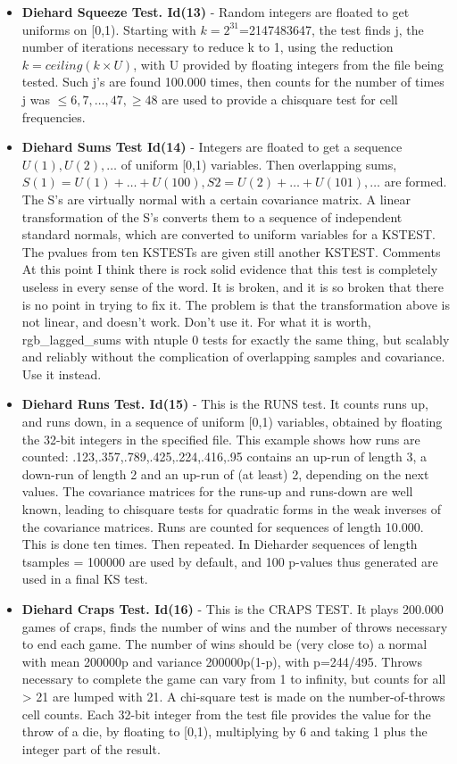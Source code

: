 \begin{itemize}
   \item \textbf{Diehard Squeeze Test. Id(13)} - 
Random integers are floated to get uniforms on [0,1). Starting with $k=2^{31}$=2147483647, the test finds j, the number of iterations necessary to reduce k to 1, using the reduction $k = ceiling(k \times U)$, with U provided by floating integers from the file being tested. Such j's are found 100.000 times, then counts for the number of times j was $\leq 6, 7,\dots, 47, \geq 48$ are used to provide a chi\-square test for cell frequencies. 
   
   \item \textbf{Diehard Sums Test Id(14)} - Integers are floated to get a sequence $U(1),U(2),\dots$ of uniform [0,1) variables. Then overlapping sums, $S(1) = U(1)+ \dots + U(100), S2 = U(2)+ \dots +U(101), \dots$ are formed. The S's are virtually normal with a certain covariance matrix.  A linear transformation of the S's converts them to a sequence of independent standard normals, which are converted  to uniform variables for a KSTEST. The p\-values from ten KSTESTs are given still another KSTEST. Comments At this point I think there is rock solid evidence that this test is completely useless in every sense of the word. It is broken, and it is so broken that there is no point in trying to fix it. The problem is that the transformation above is not linear, and doesn't work. Don't use it. For what it is worth, rgb\_lagged\_sums with ntuple 0 tests for exactly the same thing, but scalably and reliably without the complication of overlapping samples and covariance. Use it instead.
   
   \item \textbf{Diehard Runs Test. Id(15)} - This is the RUNS test. It counts runs up, and runs down, in a sequence of uniform [0,1) variables, obtained by floating the 32-bit integers in the specified file. This example    shows how runs are counted:  .123,.357,.789,.425,.224,.416,.95 contains an up-run of length 3, a down-run of length 2 and an  up-run of (at least) 2, depending on the next values.  The     covariance matrices for the runs-up and runs-down are well     known, leading to chisquare tests for quadratic forms in the   weak inverses of the covariance matrices.  Runs are counted    for sequences of length 10.000.  This is done ten times. Then  repeated. In Dieharder sequences of length tsamples = 100000 are used by default, and 100 p-values thus generated are used in a final KS test.
   
   \item \textbf{Diehard Craps Test. Id(16)} - This is the CRAPS TEST. It plays 200.000 games of craps, finds  the number of wins and the number of throws necessary to end  each game.  The number of wins should be (very close to) a normal with mean 200000p and variance 200000p(1-p), with p=244/495.  Throws necessary to complete the game can vary from 1 to infinity, but counts for all > 21 are lumped with 21. A chi-square test is made on the number-of-throws cell counts. Each 32-bit integer from the test file provides the value for the throw of a die, by floating to [0,1), multiplying by 6 and taking 1 plus the integer part of the result.
   

\end{itemize}
